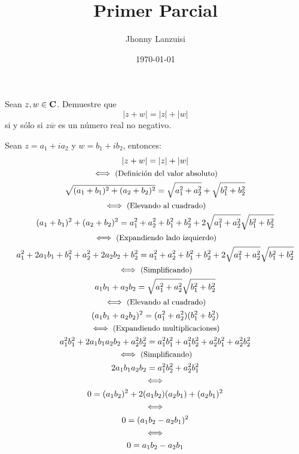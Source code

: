 \documentclass{article}
\newcommand{\comment}[1]{\text{\small #1}}
\begin{document}
%
\title{Primer Parcial}
\author{Jhonny Lanzuisi}
\date{\today}
\maketitle

\exercise
Sean $z, w \in \mathbf{C}$. Demuestre que
\[
    |z + w| = |z| + |w|
\]
si y sólo si $z \overline{w}$ es un número real no negativo.

\solution
Sean $z = a_1 + ia_2$ y $w = b_1 + ib_2$, entonces:
\allowdisplaybreaks
\begin{gather*}
    |z + w| = |z| + |w| \\
    \iff\comment{(Definición del valor absoluto)} \\
    \sqrt{(a_1 + b_1)^2 + (a_2 + b_2)^2}
        = \sqrt{a_1^2 + a_2^2} + \sqrt{b_1^2 + b_2^2} \\
    \iff\comment{(Elevando al cuadrado)}\\
    (a_1 + b_1)^2 + (a_2 + b_2)^2
        = a_1^2 + a_2^2 + b_1^2 + b_2^2
            + 2 \sqrt{a_1^2 + a_2^2} \sqrt{b_1^2 + b_2^2}\\
    \iff\comment{(Expandiendo lado izquierdo)}\\
    a_1^2 + 2a_1b_1 + b_1^2 + a_2^2 + 2a_2b_2 + b_2^2
            = a_1^2 + a_2^2 + b_1^2 + b_2^2
                + 2 \sqrt{a_1^2 + a_2^2} \sqrt{b_1^2 + b_2^2}\\
    \iff\comment{(Simplificando)}\\
    a_1b_1 + a_2b_2 = \sqrt{a_1^2 + a_2^2} \sqrt{b_1^2 + b_2^2}\\
    \iff\comment{(Elevando al cuadrado)}\\
    (a_1b_1 + a_2b_2)^2 = (a_1^2 + a_2^2) (b_1^2 + b_2^2)\\
    \iff\comment{(Expandiendo multiplicaciones)}\\
    a_1^2b_1^2 + 2a_1b_1a_2b_2 + a_2^2b_2^2
        = a_1^2b_1^2 + a_1^2b_2^2 + a_2^2b_1^2 + a_2^2b_2^2\\
    \iff\comment{(Simplificando)}\\
    2a_1b_1a_2b_2 = a_1^2b_2^2 + a_2^2b_1^2\\
    \iff\\
    0 = (a_1b_2)^2 + 2(a_1b_2)(a_2b_1) + (a_2b_1)^2\\
    \iff\\
    0 = (a_1b_2 - a_2b_1)^2\\
    \iff\\
    0 = a_1b_2 - a_2b_1
\end{gather*}
\end{document}
